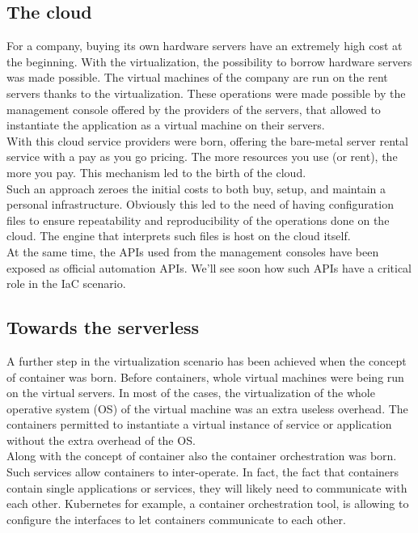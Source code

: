 \subsection{The cloud}
For a company, buying its own hardware servers have an extremely high cost at the beginning.
With the virtualization, the possibility to borrow hardware servers was made possible.
The virtual machines of the company are run on the rent servers thanks to the virtualization.
These operations were made possible by the management console offered by the providers of the servers, that allowed to instantiate the application as a virtual machine on their servers.\\
With this cloud service providers were born, offering the bare-metal server rental service with a pay as you go pricing.
The more resources you use (or rent), the more you pay.
This mechanism led to the birth of the cloud.\\
Such an approach zeroes the initial costs to both buy, setup, and maintain a personal infrastructure.
Obviously this led to the need of having configuration files to ensure repeatability and reproducibility of the operations done on the cloud.
The engine that interprets such  files is host on the cloud itself.\\
At the same time, the APIs used from the management consoles have been exposed as official automation APIs.
We'll see soon how such APIs have a critical role in the IaC scenario.

\subsection{Towards the serverless}
A further step in the virtualization scenario has been achieved when the concept of container was born.
Before containers, whole virtual machines were being run on the virtual servers.
In most of the cases, the virtualization of the whole operative system (OS) of the virtual machine was an extra useless overhead.
The containers permitted to instantiate a virtual instance of service or application without the extra overhead of the OS.\\
Along with the concept of container also the container orchestration was born.
Such services allow containers to inter-operate.
In fact, the fact that containers contain single applications or services, they will likely need to communicate with each other.
Kubernetes for example, a container orchestration tool, is allowing to configure the interfaces to let containers communicate to each other.

